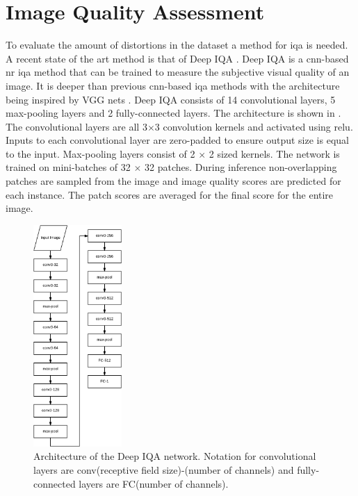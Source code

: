 \section{Image Quality Assessment}\label{sec:iqaimp}
To evaluate the amount of distortions in the dataset a method for \gls{iqa} is needed. A recent state of the art method is that of Deep IQA \cite{deepiqa}. Deep IQA is a \gls{cnn}-based \gls{nr} \gls{iqa} method that can be trained to measure the subjective visual quality of an image. It is deeper than previous \gls{cnn}-based \gls{iqa} methods with the architecture being inspired by VGG nets \cite{vgg16}. Deep IQA consists of 14 convolutional layers, 5 max-pooling layers and 2 fully-connected layers. The architecture is shown in . The convolutional layers are all 3$\times$3 convolution kernels and activated using \gls{relu}. Inputs to each convolutional layer are zero-padded to ensure output size is equal to the input. Max-pooling layers consist of 2 $\times$ 2 sized kernels. The network is trained on mini-batches of 32 $\times$ 32 patches. During inference non-overlapping patches are sampled from the image and image quality scores are predicted for each instance. The patch scores are averaged for the final score for the entire image. 

\begin{figure}[H]
  \centering
    \includegraphics[width=0.3\textwidth]{Figs/Implementation/deepiqa_arch.pdf}
      \caption{Architecture of the Deep IQA network. Notation for convolutional layers are conv(receptive field size)-(number of channels) and fully-connected layers are FC(number of channels).}
    \label{fig:deepiqa_arch}
\end{figure}


